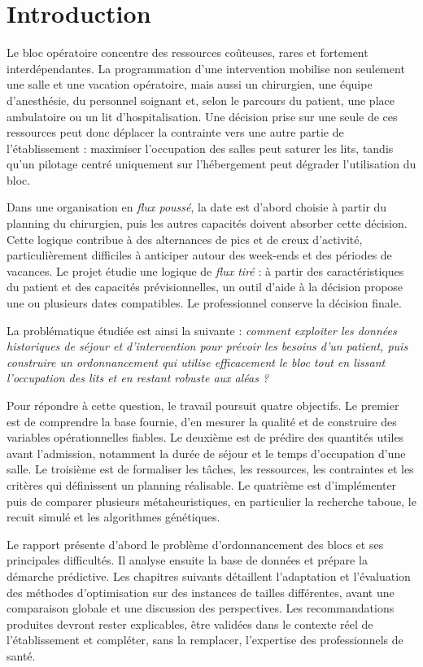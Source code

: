 \chapter*{Introduction}

Le bloc opératoire concentre des ressources coûteuses, rares et fortement interdépendantes. La programmation d'une intervention mobilise non seulement une salle et une vacation opératoire, mais aussi un chirurgien, une équipe d'anesthésie, du personnel soignant et, selon le parcours du patient, une place ambulatoire ou un lit d'hospitalisation. Une décision prise sur une seule de ces ressources peut donc déplacer la contrainte vers une autre partie de l'établissement : maximiser l'occupation des salles peut saturer les lits, tandis qu'un pilotage centré uniquement sur l'hébergement peut dégrader l'utilisation du bloc.

Dans une organisation en \emph{flux poussé}, la date est d'abord choisie à partir du planning du chirurgien, puis les autres capacités doivent absorber cette décision. Cette logique contribue à des alternances de pics et de creux d'activité, particulièrement difficiles à anticiper autour des week-ends et des périodes de vacances. Le projet étudie une logique de \emph{flux tiré} : à partir des caractéristiques du patient et des capacités prévisionnelles, un outil d'aide à la décision propose une ou plusieurs dates compatibles. Le professionnel conserve la décision finale.

La problématique étudiée est ainsi la suivante : \emph{comment exploiter les données historiques de séjour et d'intervention pour prévoir les besoins d'un patient, puis construire un ordonnancement qui utilise efficacement le bloc tout en lissant l'occupation des lits et en restant robuste aux aléas ?}

Pour répondre à cette question, le travail poursuit quatre objectifs. Le premier est de comprendre la base fournie, d'en mesurer la qualité et de construire des variables opérationnelles fiables. Le deuxième est de prédire des quantités utiles avant l'admission, notamment la durée de séjour et le temps d'occupation d'une salle. Le troisième est de formaliser les tâches, les ressources, les contraintes et les critères qui définissent un planning réalisable. Le quatrième est d'implémenter puis de comparer plusieurs métaheuristiques, en particulier la recherche taboue, le recuit simulé et les algorithmes génétiques.

Le rapport présente d'abord le problème d'ordonnancement des blocs et ses principales difficultés. Il analyse ensuite la base de données et prépare la démarche prédictive. Les chapitres suivants détaillent l'adaptation et l'évaluation des méthodes d'optimisation sur des instances de tailles différentes, avant une comparaison globale et une discussion des perspectives. Les recommandations produites devront rester explicables, être validées dans le contexte réel de l'établissement et compléter, sans la remplacer, l'expertise des professionnels de santé.
